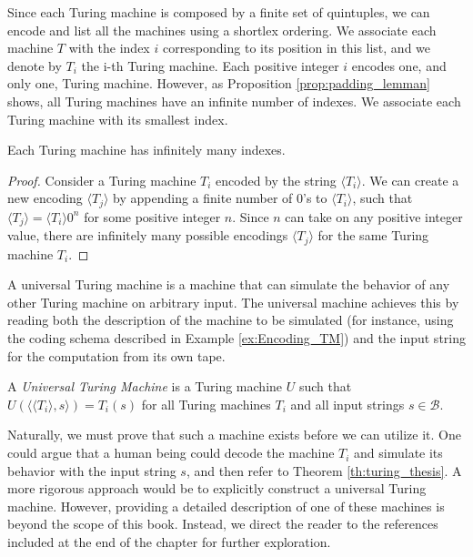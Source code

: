 Since each Turing machine is composed by a finite set of quintuples, we can encode and list all the machines using a shortlex ordering. We associate each machine $T$ with the index $i$ corresponding to its position in this list, and we denote by $T_i$ the i-th Turing machine. Each positive integer $i$ encodes one, and only one, Turing machine. However, as Proposition \ref{prop:padding_lemman} shows, all Turing machines have an infinite number of indexes. We associate each Turing machine with its smallest index.

\begin{proposition}
\label{prop:padding_lemman}
Each Turing machine has infinitely many indexes.
\end{proposition}
\begin{proof}
Consider a Turing machine $T_i$ encoded by the string $\langle T_i \rangle$. We can create a new encoding $\langle T_j \rangle$  by appending a finite number of 0's to $\langle T_i \rangle$,  such that $\langle T_j \rangle = \langle T_i \rangle 0^n$  for some positive integer $n$. Since $n$ can take on any positive integer value, there are infinitely many possible encodings $\langle T_j \rangle$ for the same Turing machine $T_i$.
\end{proof}

A universal Turing machine is a machine that can simulate the behavior of any other Turing machine on arbitrary input. The universal machine achieves this by reading both the description of the machine to be simulated (for instance, using the coding schema described in Example \ref{ex:Encoding_TM}) and the input string for the computation from its own tape.

\begin{definition}
\label{def:Universal-Turing-Machine}
A \emph{Universal Turing Machine} is a Turing machine $U$ such that $U(\langle \langle T_i\rangle, s \rangle) = T_i(s)$ for all Turing machines $T_i$ and all input strings $s \in \mathcal{B}$.
\end{definition}

Naturally, we must prove that such a machine exists before we can utilize it. One could argue that a human being could decode the machine $T_i$ and simulate its behavior with the input string $s$, and then refer to Theorem \ref{th:turing_thesis}. A more rigorous approach would be to explicitly construct a universal Turing machine. However, providing a detailed description of one of these machines is beyond the scope of this book. Instead, we direct the reader to the references included at the end of the chapter for further exploration.


